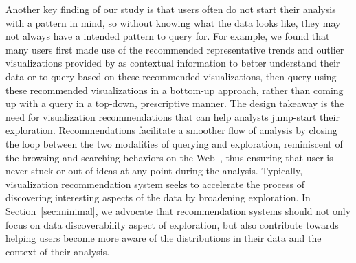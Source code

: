 \par Another key finding of our study is that users often do not start their analysis with a pattern in mind, so without knowing what the data looks like, they may not always have a intended pattern to query for. For example, we found that many users first made use of the recommended representative trends and outlier visualizations provided by \zv as contextual information to better understand their data or to query based on these recommended visualizations, then query using these recommended visualizations in a bottom-up approach, rather than coming up with a query in a top-down, prescriptive manner. The design takeaway is the need for visualization recommendations that can help analysts jump-start their exploration. Recommendations facilitate a smoother flow of analysis by closing the loop between the two modalities of querying and exploration, reminiscent of the browsing and searching behaviors on the Web~\cite{Olston2003}, thus ensuring that user is never stuck or out of ideas at any point during the analysis. Typically, visualization recommendation system seeks to accelerate the process of discovering interesting aspects of the data by broadening exploration. In Section~\ref{sec:minimal}, we advocate that recommendation systems should not only focus on data discoverability aspect of exploration, but also contribute towards helping users become more aware of the distributions in their data and the context of their analysis.

